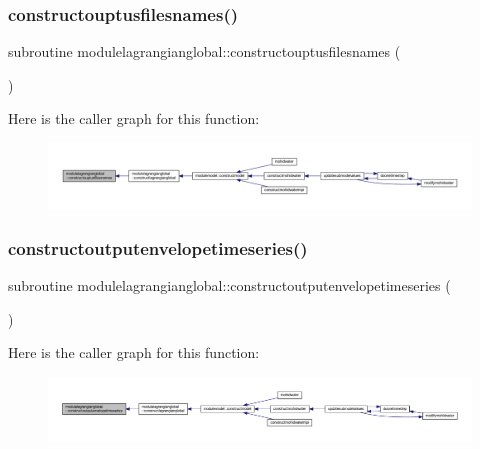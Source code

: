 \subsubsection{\texorpdfstring{constructouptusfilesnames()}{constructouptusfilesnames()}}
{\footnotesize\ttfamily subroutine modulelagrangianglobal\+::constructouptusfilesnames (\begin{DoxyParamCaption}{ }\end{DoxyParamCaption})\hspace{0.3cm}{\ttfamily [private]}}

Here is the caller graph for this function\+:\nopagebreak
\begin{figure}[H]
\begin{center}
\leavevmode
\includegraphics[width=350pt]{namespacemodulelagrangianglobal_a083836de958c69614f913a7f1b0bee9e_icgraph}
\end{center}
\end{figure}
\mbox{\label{namespacemodulelagrangianglobal_ac9b3291ed411a75cceb9948f7f671764}} 
\subsubsection{\texorpdfstring{constructoutputenvelopetimeseries()}{constructoutputenvelopetimeseries()}}
{\footnotesize\ttfamily subroutine modulelagrangianglobal\+::constructoutputenvelopetimeseries (\begin{DoxyParamCaption}{ }\end{DoxyParamCaption})\hspace{0.3cm}{\ttfamily [private]}}

Here is the caller graph for this function\+:\nopagebreak
\begin{figure}[H]
\begin{center}
\leavevmode
\includegraphics[width=350pt]{namespacemodulelagrangianglobal_ac9b3291ed411a75cceb9948f7f671764_icgraph}
\end{center}
\end{figure}
\mbox{\label{namespacemodulelagrangianglobal_a43f3d0f411e8d9b0df16d63f033382ff}} 
